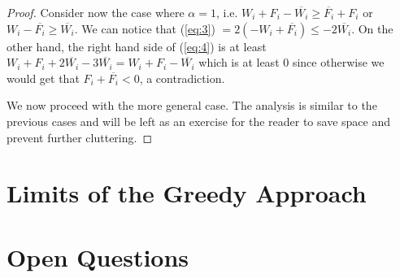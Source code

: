 \documentclass[11pt,letter]{article}
\begin{document}
\begin{proof}
Consider now the case where $\alpha = 1$, i.e. $W_i + F_i -\overline{W_i} \geq \overline{F_i} + F_i$ or $W_i - \overline{F_i} \geq \overline{W_i}$.
We can notice that (\ref{eq:3}) $= 2(-W_i + \overline{F_i}) \leq -2\overline{W_i}$. On the other hand, the right hand side of  (\ref{eq:4})
is at least $W_i + F_i + 2\overline{W_i} -3\overline{W_i} = W_i + F_i - \overline{W_i}$ which is at least $0$ since otherwise we would get
that $F_i + \overline{F_i} < 0$, a contradiction.

We now proceed with the more general case. The analysis is similar to the previous cases and will be left as an exercise
for the reader to save space and prevent further cluttering.

\end{proof}


\section{Limits of the Greedy Approach}\label{S:limits}




\section{Open Questions}\label{S:open}




\end{document}
